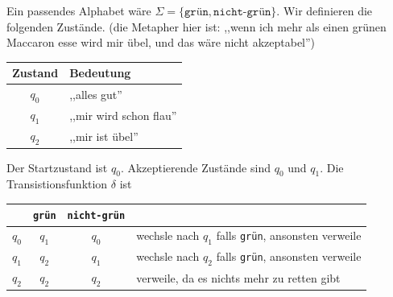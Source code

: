 \begin{Bsp}
\begin{center}
\end{center}
Ein passendes Alphabet wäre $\Sigma = \{\texttt{grün} , \texttt{nicht-grün} \}$.
Wir definieren die folgenden Zustände.
(die Metapher hier ist: ,,wenn ich mehr als einen grünen Maccaron esse wird mir übel, und das wäre nicht akzeptabel'')
\begin{center}
\begin{tabular}{cl}
  Zustand & Bedeutung \\
  \hline
  $q_0$& ,,alles gut'' \\
  $q_1$& ,,mir wird schon flau'' \\
  $q_2$& ,,mir ist übel''
\end{tabular}
\end{center}
Der Startzustand ist $q_0$.
Akzeptierende Zustände sind $q_0$ und $q_1$.
Die Transistionsfunktion $\delta$ ist
\begin{center}
\begin{tabular}{cccl}
  &\texttt{grün} & \texttt{nicht-grün} \\
  \hline
  $q_0$ & $q_1$ & $q_0$ & wechsle nach $q_1$ falls \texttt{grün}, ansonsten verweile \\
  $q_1$ & $q_2$ & $q_1$ & wechsle nach $q_2$ falls \texttt{grün}, ansonsten verweile \\
  $q_2$  & $q_2$ & $q_2$ & verweile, da es nichts mehr zu retten gibt
\end{tabular}
\end{center}
\end{Bsp}


